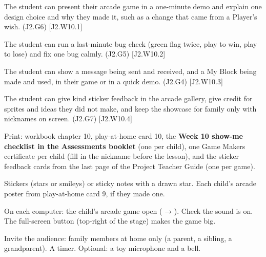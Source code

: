 
\begin{objectives}
  \item The student can present their arcade game in a one-minute demo and explain one design choice and why they made it, such as a change that came from a Player's wish. (J2.G6) [J2.W10.1]
  \item The student can run a last-minute bug check (green flag twice, play to win, play to lose) and fix one bug calmly. (J2.G5) [J2.W10.2]
  \item The student can show a message being sent and received, and a My Block being made and used, in their game or in a quick demo. (J2.G4) [J2.W10.3]
  \item The student can give kind sticker feedback in the arcade gallery, give credit for sprites and ideas they did not make, and keep the showcase for family only with nicknames on screen. (J2.G7) [J2.W10.4]
\end{objectives}

\begin{materials}
  \item Print: workbook chapter 10, play-at-home card 10, the \textbf{Week 10 show-me checklist in the Assessments booklet} (one per child), one Game Makers certificate per child (fill in the nickname before the lesson), and the sticker feedback cards from the last page of the Project Teacher Guide (one per game).
  \item Stickers (stars or smileys) or sticky notes with a drawn star. Each child's arcade poster from play-at-home card 9, if they made one.
  \item On each computer: the child's arcade game open ( → ). Check the sound is on. The full-screen button (top-right of the stage) makes the game big.
  \item Invite the audience: family members at home only (a parent, a sibling, a grandparent). A timer. Optional: a toy microphone and a bell.
\end{materials}

